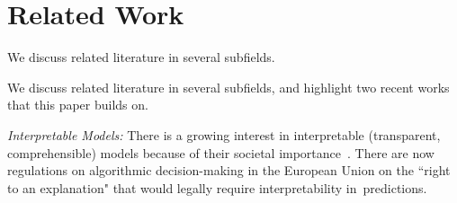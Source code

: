 %
%
%
%
%
%

\section{Related Work}

\begin{kdd}
We discuss related literature in several subfields.
\end{kdd}
\begin{arxiv}
We discuss related literature in several subfields, and highlight two recent works that this paper builds on.
\end{arxiv}

\textit{Interpretable Models:} There is a growing interest in interpretable (transparent, comprehensible) models because of their societal importance~\citep[see ][]{ruping2006learning,bratko1997machine,dawes1979robust,VellidoEtAl12,Giraud98,Holte93,Schmueli10,Huysmans11,Freitas14}. There are now regulations on algorithmic decision-making in the European Union on the ``right to an explanation" \citep{Goodman2016EU} that would legally require interpretability in~predictions.


